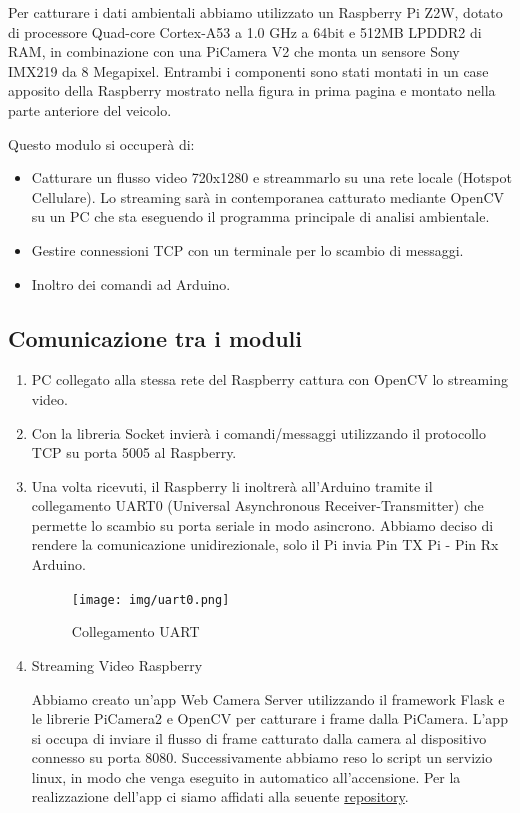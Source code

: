 \documentclass{article}
\begin{document}
 Per catturare i dati ambientali abbiamo utilizzato un Raspberry Pi Z2W, dotato di processore Quad-core Cortex-A53 a 1.0 GHz a 64bit e 512MB LPDDR2 di RAM, in combinazione con una \cite{picamera} PiCamera V2 che monta un sensore Sony IMX219 da 8 Megapixel. Entrambi i componenti sono stati montati in un case apposito della Raspberry mostrato nella figura in prima pagina e montato nella parte anteriore del veicolo.

Questo modulo si occuperà di:
\begin{itemize}
\item Catturare un flusso video 720x1280 e streammarlo su una rete locale (Hotspot Cellulare). Lo streaming sarà in contemporanea catturato mediante OpenCV su un PC che sta eseguendo il programma principale di analisi ambientale.
\item Gestire connessioni TCP con un terminale per lo scambio di messaggi.
\item Inoltro dei comandi ad Arduino.
\end{itemize}

\subsection{Comunicazione tra i moduli}
\begin{enumerate}
\item PC collegato alla stessa rete del Raspberry cattura con OpenCV lo streaming video.
\item  Con la libreria Socket invierà i comandi/messaggi utilizzando il protocollo TCP su porta 5005 al Raspberry.
\item Una volta ricevuti, il Raspberry li inoltrerà all'Arduino tramite il collegamento UART0 (Universal Asynchronous Receiver-Transmitter) che permette lo scambio su porta seriale in modo asincrono. Abbiamo deciso di rendere la comunicazione unidirezionale, solo il Pi invia Pin TX Pi - Pin Rx Arduino.  
\begin{figure}[h!]
  \centering
  \texttt{[image: img/uart0.png]}
    \caption{Collegamento UART}
\end{figure}

\item \cite{flaskstream} Streaming Video Raspberry

    Abbiamo creato un'app Web Camera Server utilizzando il framework Flask e le librerie PiCamera2 e OpenCV per catturare i frame dalla PiCamera. L'app si occupa di inviare il flusso di frame catturato dalla camera al dispositivo connesso su porta 8080.
    Successivamente abbiamo reso lo script un servizio linux, in modo che venga eseguito in automatico all'accensione. Per la realizzazione dell'app ci siamo affidati alla seuente \href{https://github.com/miguelgrinberg/flask-video-streaming/tree/v1}{repository}. 
\end{enumerate}
\end{document}

